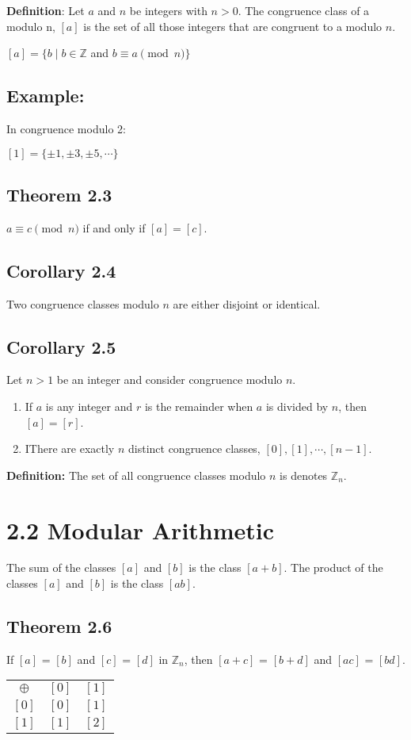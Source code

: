 \documentclass{article}
\begin{document}
\textbf{Definition}: Let $a$ and $n$ be integers with $n>0$. The congruence class of a modulo n, $[a]$
is the set of all those integers that are congruent to a modulo $n$.
\begin{center}
    $[a] = \{b\mid b \in \mathbb{Z}$ and $b \equiv a \pmod{n}\}$
\end{center}

\subsection*{Example:}
In congruence modulo 2:
\begin{center}
    $[1] = \{\pm1,\pm3,\pm5,\cdots\}$
\end{center}

\subsection*{Theorem 2.3}
$a \equiv c \pmod{n}$ if and only if $[a]=[c]$.

\subsection*{Corollary 2.4}
Two congruence classes modulo $n$ are either disjoint or identical.

\subsection*{Corollary 2.5}
Let $n > 1$ be an integer and consider congruence modulo $n$.
\begin{enumerate}
    \item If $a$ is any integer and $r$ is the remainder when $a$ is divided by $n$, then $[a]=[r]$.
    \item IThere are exactly $n$ distinct congruence classes, $[0], [1], \cdots, [n-1]$.
\end{enumerate}

\textbf{Definition:} The set of all congruence classes modulo $n$ is denotes $\mathbb{Z}_n$.

\section*{2.2 Modular Arithmetic}
The sum of the classes $[a]$ and $[b]$ is the class $[a+b]$. The product of the classes $[a]$ and $[b]$ is the class $[ab]$.\\

\subsection*{Theorem 2.6}
If $[a]$ = $[b]$ and $[c]$ = $[d]$ in $\mathbb{Z}_n$, then $[a+c]$ = $[b+d]$ and $[ac]$ = $[bd]$.

\begin{tabular}{||c c c||}
    $\oplus$ & $[0]$ & $[1]$ \\
    $[0]$ & $[0]$ & $[1]$ \\
    $[1]$ & $[1]$ & $[2]$ \\

\end{tabular}
\end{document}

